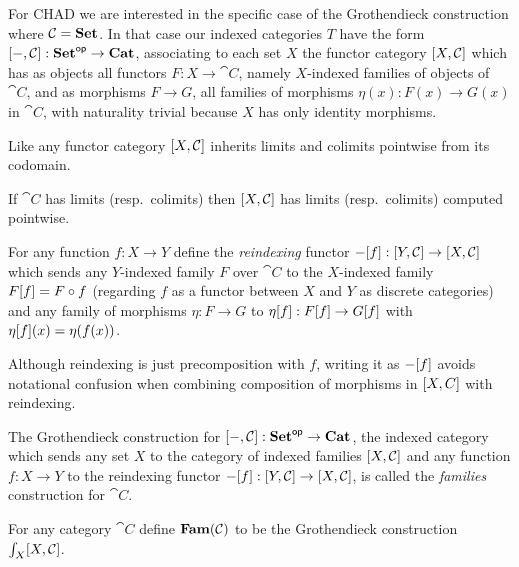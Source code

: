For CHAD we are interested in the specific case of the Grothendieck construction where $\mathcal{C} = \mathbf{Set}$. In
that case our indexed categories $T$ have the form $[-,\mathcal{C}]: \mathbf{Set}^{\mathsf{op}} \to \mathbf{Cat}$, associating to each
set $X$ the functor category $[X,\mathcal{C}]$ which has as objects all functors $F: X \to \cat{C}$, namely
$X$-indexed families of objects of $\cat{C}$, and as morphisms $F \to G$, all families of morphisms $\eta(x):
F(x) \to G(x)$ in $\cat{C}$, with naturality trivial because $X$ has only identity morphisms.

Like any functor category $[X,\mathcal{C}]$ inherits limits and colimits pointwise from its codomain.

\begin{proposition}
If $\cat{C}$ has limits (resp.~colimits) then $[X,\mathcal{C}]$ has limits (resp.~colimits) computed
pointwise.
\end{proposition}

\begin{definition}[Reindexing]
For any function $f: X \to Y$ define the \emph{reindexing} functor $-[f]: [Y,\mathcal{C}] \to
[X,\mathcal{C}]$ which sends any $Y$-indexed family $F$ over $\cat{C}$ to the $X$-indexed family
$F[f] = F \circ f$ (regarding $f$ as a functor between $X$ and $Y$ as discrete categories) and any
family of morphisms $\eta: F \to G$ to $\eta[f]: F[f] \to G[f]$ with
$\eta[f](x) = \eta(f(x))$. 
\end{definition}

\noindent Although reindexing is just precomposition with $f$, writing it as $-[f]$ avoids
notational confusion when combining composition of morphisms in $[X,C]$ with reindexing.

The Grothendieck construction for $[-,\mathcal{C}]: \mathbf{Set}^{\mathsf{op}} \to \mathbf{Cat}$, the indexed category which sends
any set $X$ to the category of indexed families $[X,\mathcal{C}]$ and any function $f: X \to Y$ to the
reindexing functor $-[f]: [Y,\mathcal{C}] \to [X,\mathcal{C}]$, is called the \emph{families}
construction for $\cat{C}$.

\begin{definition}
\label{def:Fam}
For any category $\cat{C}$ define $\mathbf{Fam}(\mathcal{C})$ to be the Grothendieck construction
$\int_{X}[X,\mathcal{C}]$.
\end{definition}


